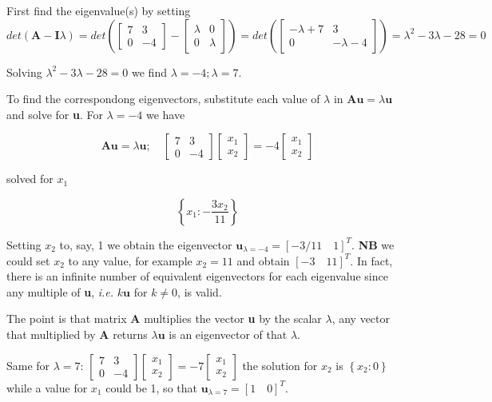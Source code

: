 First find the eigenvalue(s) by setting
$$
det(\mathbf{A - I}\lambda) =
det(\left[\begin{matrix}7 & 3\\0 & -4\end{matrix}\right] - \left[\begin{matrix}\lambda & 0\\0 & \lambda\end{matrix}\right]) =
det(\left[\begin{matrix}- \lambda + 7 & 3\\0 & - \lambda - 4\end{matrix}\right]) =
\lambda^{2} - 3 \lambda - 28 = 0
$$

Solving $\lambda^{2} - 3 \lambda - 28 = 0$ we find $\lambda = -4; \lambda= 7$.

To find the correspondong eigenvectors, substitute each value of $\lambda$ in $\mathbf{Au} = \lambda\mathbf{u}$
and solve for \textbf{u}. For $\lambda= -4$ we have

$$
\mathbf{Au} = \lambda\mathbf{u}; \quad
\left[\begin{matrix}7 & 3\\0 & -4\end{matrix}\right]
\left[\begin{matrix}x_{1}\\x_{2}\end{matrix}\right] = -4 \left[\begin{matrix}x_{1}\\x_{2}\end{matrix}\right]
$$

solved for $x_1$

$$
\left \{ x_{1} : - \frac{3 x_{2}}{11}\right \}
$$

Setting $x_2$ to, say, 1 we obtain the eigenvector $\mathbf{u}_{\lambda= -4}= [-3/11 \quad 1]^T$. \textbf{NB} we could
set $x_2$ to any value, for example $x_2= 11$ and obtain $[-3 \quad 11]^T$. In fact,
there is an infinite number of equivalent eigenvectors for each eigenvalue since
any multiple of \textbf{u}, \emph{i.e.} $k\mathbf{u}$ for $k \neq 0$, is valid.

The point is that matrix \textbf{A} multiplies the vector \textbf{u} by the scalar
$\lambda$, any vector that multiplied by \textbf{A} returns $\lambda\mathbf{u}$ is
an eigenvector of that $\lambda$.

Same for $\lambda= 7$:
$\left[\begin{matrix}7 & 3\\0 & -4\end{matrix}\right]
\left[\begin{matrix}x_{1}\\x_{2}\end{matrix}\right] = -7 \left[\begin{matrix}x_{1}\\x_{2}\end{matrix}\right]
$
the solution for $x_2$ is $\left \{ x_{2} : 0\right \}$ while a value for $x_1$
could be 1, so that $\mathbf{u}_{\lambda= 7} = [1 \quad 0]^T$.

